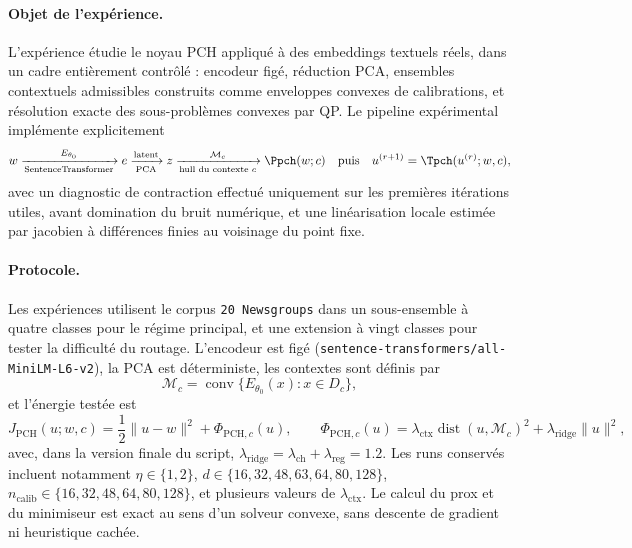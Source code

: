 \paragraph{Objet de l'expérience.}
L'expérience étudie le noyau PCH appliqué à des embeddings textuels réels, dans un cadre entièrement contrôlé : encodeur figé, réduction PCA, ensembles contextuels admissibles construits comme enveloppes convexes de calibrations, et résolution exacte des sous-problèmes convexes par QP. Le pipeline expérimental implémente explicitement
\[
w \xrightarrow[\text{SentenceTransformer}]{E_{\theta_0}}
e \xrightarrow[\text{PCA}]{\text{latent}}
z \xrightarrow[\text{hull du contexte } c]{\mathcal M_c}
\Ppch(w;c)
\quad\text{puis}\quad
u^{(r+1)}=\Tpch(u^{(r)};w,c),
\]
avec un diagnostic de contraction effectué uniquement sur les premières itérations utiles, avant domination du bruit numérique, et une linéarisation locale estimée par jacobien à différences finies au voisinage du point fixe.

\paragraph{Protocole.}
Les expériences utilisent le corpus \texttt{20 Newsgroups} dans un sous-ensemble à quatre classes pour le régime principal, et une extension à vingt classes pour tester la difficulté du routage. L’encodeur est figé (\texttt{sentence-transformers/all-MiniLM-L6-v2}), la PCA est déterministe, les contextes sont définis par
\[
\mathcal M_c=\operatorname{conv}\{E_{\theta_0}(x):x\in D_c\},
\]
et l’énergie testée est
\[
J_{\mathrm{PCH}}(u;w,c)=\frac12\|u-w\|^2+\Phi_{\mathrm{PCH},c}(u),
\qquad
\Phi_{\mathrm{PCH},c}(u)=\lambda_{\mathrm{ctx}}\operatorname{dist}(u,\mathcal M_c)^2+\lambda_{\mathrm{ridge}}\|u\|^2,
\]
avec, dans la version finale du script, \(\lambda_{\mathrm{ridge}}=\lambda_{\mathrm{ch}}+\lambda_{\mathrm{reg}}=1.2\). Les runs conservés incluent notamment \(\eta\in\{1,2\}\), \(d\in\{16,32,48,63,64,80,128\}\), \(n_{\mathrm{calib}}\in\{16,32,48,64,80,128\}\), et plusieurs valeurs de \(\lambda_{\mathrm{ctx}}\). Le calcul du prox et du minimiseur est exact au sens d’un solveur convexe, sans descente de gradient ni heuristique cachée.


